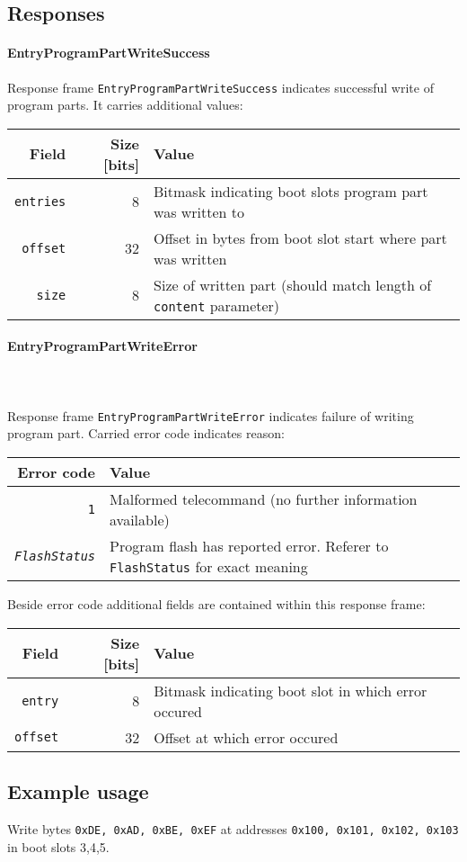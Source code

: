 \subsection{Responses}

\paragraph{EntryProgramPartWriteSuccess}
Response frame \texttt{EntryProgramPartWriteSuccess} indicates successful write of program parts. It carries additional values:

\begin{tabular}{r | r | l}
	Field & Size [bits] & Value \\
	\hline
	\texttt{entries} & 8 & Bitmask indicating boot slots program part was written to \\	
	\texttt{offset} & 32 & Offset in bytes from boot slot start where part was written \\
	\texttt{size} & 8 & Size of written part (should match length of \texttt{content} parameter) \\
\end{tabular}

\paragraph{EntryProgramPartWriteError} \mbox{} \\
 \\
Response frame \texttt{EntryProgramPartWriteError} indicates failure of writing program part. Carried error code indicates reason:

\begin{tabular}{r | l}
	Error code & Value \\
	\hline
	\texttt{1} & Malformed telecommand (no further information available) \\	
	\texttt{\textit{FlashStatus}} & Program flash has reported error. Referer to \texttt{FlashStatus} for exact meaning \\	
\end{tabular}

Beside error code additional fields are contained within this response frame:

\begin{tabular}{r | r | l}
	Field & Size [bits] & Value \\
	\hline
	\texttt{entry} & 8 & Bitmask indicating boot slot in which error occured \\	
	\texttt{offset} & 32 & Offset at which error occured \\
\end{tabular}


\subsection{Example usage}
Write bytes \texttt{0xDE, 0xAD, 0xBE, 0xEF} at addresses \texttt{0x100, 0x101, 0x102, 0x103} in boot slots 3,4,5.

